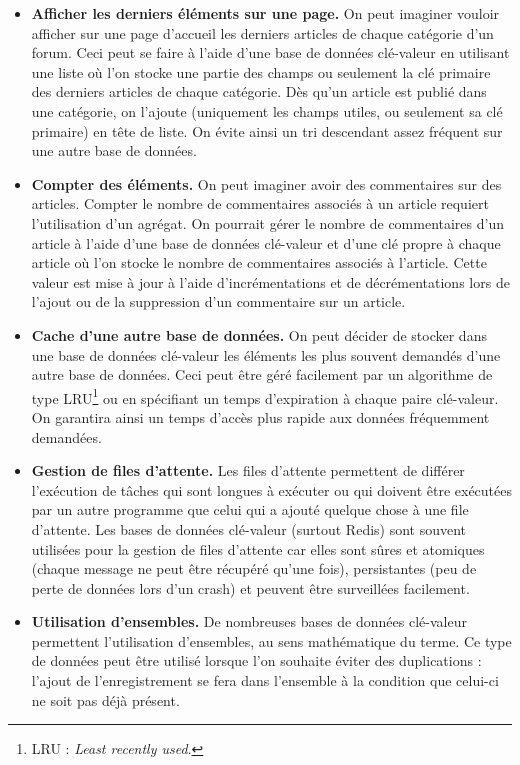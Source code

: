 	\begin{itemize}
	 	\item \textbf{Afficher les derniers éléments sur une page.} On peut imaginer vouloir afficher sur une page d'accueil les derniers articles de chaque catégorie d'un forum. Ceci peut se faire à l'aide d'une base de données clé-valeur en utilisant une liste où l'on stocke une partie des champs ou seulement la clé primaire des derniers articles de chaque catégorie. Dès qu'un article est publié dans une catégorie, on l'ajoute (uniquement les champs utiles, ou seulement sa clé primaire) en tête de liste. On évite ainsi un tri descendant assez fréquent sur une autre base de données.
	 	\item \textbf{Compter des éléments.} On peut imaginer avoir des commentaires sur des articles. Compter le nombre de commentaires associés à un article requiert l'utilisation d'un agrégat. On pourrait gérer le nombre de commentaires d'un article à l'aide d'une base de données clé-valeur et d'une clé propre à chaque article où l'on stocke le nombre de commentaires associés à l'article. Cette valeur est mise à jour à l'aide d'incrémentations et de décrémentations lors de l'ajout ou de la suppression d'un commentaire sur un article.
	 	\item \textbf{Cache d'une autre base de données.} On peut décider de stocker dans une base de données clé-valeur les éléments les plus souvent demandés d'une autre base de données. Ceci peut être géré facilement par un algorithme de type LRU\footnote{LRU : \textit{Least recently used}.} ou en spécifiant un temps d'expiration à chaque paire clé-valeur. On garantira ainsi un temps d'accès plus rapide aux données fréquemment demandées.
	 	\item \textbf{Gestion de files d'attente.} Les files d'attente permettent de différer l'exécution de tâches qui sont longues à exécuter ou qui doivent être exécutées par un autre programme que celui qui a ajouté quelque chose à une file d'attente. Les bases de données clé-valeur (surtout Redis) sont souvent utilisées pour la gestion de files d'attente car elles sont sûres et atomiques (chaque message ne peut être récupéré qu'une fois), persistantes (peu de perte de données lors d'un crash) et peuvent être surveillées facilement.
	 	\item \textbf{Utilisation d'ensembles.} De nombreuses bases de données clé-valeur permettent l'utilisation d'ensembles, au sens mathématique du terme. Ce type de données peut être utilisé lorsque l'on souhaite éviter des duplications : l'ajout de l'enregistrement se fera dans l'ensemble à la condition que celui-ci ne soit pas déjà présent.
	 \end{itemize} 

